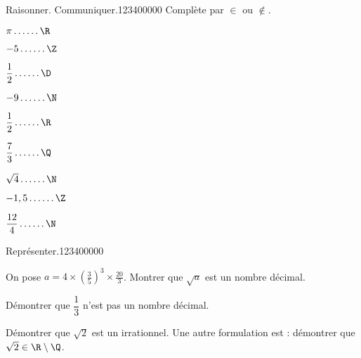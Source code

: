 \begin{pageAD}
\begin{ExoCad}{Raisonner. Communiquer.}{1234}{0}{0}{0}{0}{0}
Complète par  $\in$ ou $\notin$.

\begin{enumerate}
\begin{minipage}{0.32\linewidth}
\item $\pi \ldots \ldots \R$
\item $-5 \ldots \ldots \Z$
\item $\dfrac{1}{2} \ldots \ldots \D$
\end{minipage}
\hfill
\begin{minipage}{0.32\linewidth}
\item $-9 \ldots \ldots \N$
\item $\dfrac{1}{2}  \ldots \ldots \R$
\item $\dfrac{7}{3}  \ldots \ldots \Q$
\end{minipage}
\hfill
\begin{minipage}{0.32\linewidth}
\item $\sqrt{4} \ldots \ldots \N$
\item $-1,5 \ldots \ldots \Z$
\item $\dfrac{12}{4}  \ldots \ldots \N$
\end{minipage}
\end{enumerate}
 
\end{ExoCad}
 
 
 
\begin{ExoCad}{Représenter.}{1234}{0}{0}{0}{0}{0}

On pose $a=4\times \left(\frac{3}{5}\right)^3 \times \frac{20}{3}$. Montrer que $\sqrt{a}$ est un nombre décimal. 
 
 \end{ExoCad}



 
\begin{DemoE}

Démontrer que $\dfrac{1}{3}$ n'est pas un nombre décimal.


 
\end{DemoE}

 
 

 


\begin{DemoE}

Démontrer que $\sqrt{2}$ est un irrationnel. Une autre formulation est : démontrer que $\sqrt{2} \in \R\setminus\Q$.


\end{DemoE}
   


 
\end{pageAD}


